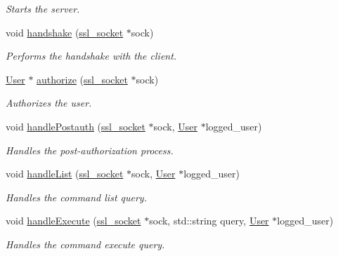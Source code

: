 \begin{DoxyCompactItemize}
\begin{DoxyCompactList}\small\item\em Starts the server. \end{DoxyCompactList}\item 
void \hyperlink{class_r_c_f_1_1_server_1_1_server_ad8a82a9353a9a68cfef80cca75a21c83}{handshake} (\hyperlink{_server_8h_a099e2c9fff985800932f4c424a126989}{ssl\+\_\+socket} $\ast$sock)
\begin{DoxyCompactList}\small\item\em Performs the handshake with the client. \end{DoxyCompactList}\item 
\hyperlink{class_r_c_f_1_1_server_1_1_user}{User} $\ast$ \hyperlink{class_r_c_f_1_1_server_1_1_server_a7403924e52783469b549326c826ec9c8}{authorize} (\hyperlink{_server_8h_a099e2c9fff985800932f4c424a126989}{ssl\+\_\+socket} $\ast$sock)
\begin{DoxyCompactList}\small\item\em Authorizes the user. \end{DoxyCompactList}\item 
void \hyperlink{class_r_c_f_1_1_server_1_1_server_ae126a238b9a511925f13a47142b6a817}{handle\+Postauth} (\hyperlink{_server_8h_a099e2c9fff985800932f4c424a126989}{ssl\+\_\+socket} $\ast$sock, \hyperlink{class_r_c_f_1_1_server_1_1_user}{User} $\ast$logged\+\_\+user)
\begin{DoxyCompactList}\small\item\em Handles the post-\/authorization process. \end{DoxyCompactList}\item 
void \hyperlink{class_r_c_f_1_1_server_1_1_server_a7430ddaf9c9c816a3ff18c82d07740be}{handle\+List} (\hyperlink{_server_8h_a099e2c9fff985800932f4c424a126989}{ssl\+\_\+socket} $\ast$sock, \hyperlink{class_r_c_f_1_1_server_1_1_user}{User} $\ast$logged\+\_\+user)
\begin{DoxyCompactList}\small\item\em Handles the command list query. \end{DoxyCompactList}\item 
void \hyperlink{class_r_c_f_1_1_server_1_1_server_ac2df80cca2c04444d1829f782c7c8a60}{handle\+Execute} (\hyperlink{_server_8h_a099e2c9fff985800932f4c424a126989}{ssl\+\_\+socket} $\ast$sock, std\+::string query, \hyperlink{class_r_c_f_1_1_server_1_1_user}{User} $\ast$logged\+\_\+user)
\begin{DoxyCompactList}\small\item\em Handles the command execute query. \end{DoxyCompactList}\item 

\end{DoxyCompactItemize}
